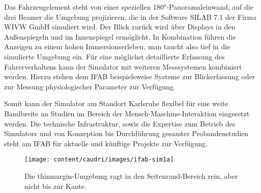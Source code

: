\begin{wrapfigure}[20]{r}[2cm]{4cm}\vspace{-0.5cm}
\end{wrapfigure}
Das Fahrzeugelement steht von einer speziellen 180°-Panoramaleinwand, auf die drei Beamer die Umgebung projizieren, die in der Software SILAB 7.1 der Firma WIVW GmbH simuliert wird. Der Blick zurück wird über Displays in den Außenspiegeln und im Innenspiegel ermöglicht. In Kombination führen die Anzeigen zu einem hohen Immersionserleben, man taucht also tief in die simulierte Umgebung ein.  Für eine möglichst detaillierte Erfassung des Fahrerverhaltens kann der Simulator mit weiteren Messsystemen kombiniert werden. Hierzu stehen dem IFAB beispielsweise Systeme zur Blickerfassung oder zur Messung physiologischer Parameter zur Verfügung.

Somit kann der Simulator am Standort Karlsruhe flexibel für eine weite Bandbreite an Studien im Bereich der Mensch-Maschine-Interaktion eingesetzt werden. Die technische Infrastruktur, sowie die Expertise zum Betrieb des Simulators und von Konzeption bis Durchführung gesamter Probandenstudien steht am IFAB für aktuelle und künftige Projekte zur Verfügung. 
\markEndOfContent %

\begin{figure*}[t]%
\begin{thinmargin} %
\texttt{[image: content/caudri/images/ifab-sim1a]}%

\caption{Die thinmargin-Umgebung ragt in den Seitenrand-Bereich rein, aber nicht bis zur Kante. }%
\end{thinmargin} %
\end{figure*}


